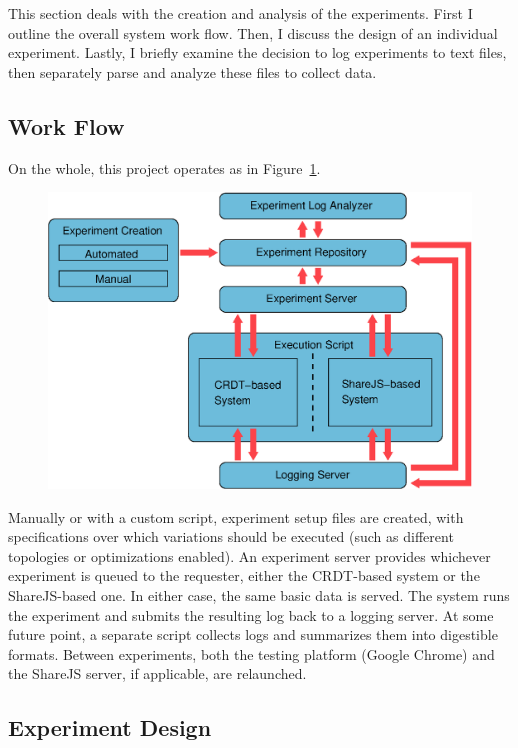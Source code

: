 \documentclass[12pt,a4paper,twoside,openright]{report}
\begin{document}
	This section deals with the creation and analysis of the experiments. First I outline the overall system work flow. Then, I discuss the design of an individual experiment. Lastly, I briefly examine the decision to log experiments to text files, then separately parse and analyze these files to collect data.

	\subsection{Work Flow}
	On the whole, this project operates as in Figure~\ref{fig:workflow}. 
	
	\begin{figure}[htb]
	\centering
	\includegraphics[width=1\linewidth]{figs/workflow.eps}
	\caption[Workflow]{}
	\label{fig:workflow}
	\end{figure}

	
	
	Manually or with a custom script, experiment setup files are created, with specifications over which variations should be executed (such as different topologies or optimizations enabled). An experiment server provides whichever experiment is queued to the requester, either the CRDT-based system or the ShareJS-based one. In either case, the same basic data is served. The system runs the experiment and submits the resulting log back to a logging server. At some future point, a separate script collects logs and summarizes them into digestible formats. Between experiments, both the testing platform (Google Chrome) and the ShareJS server, if applicable, are relaunched.

	\subsection{Experiment Design}
	
\end{document}
